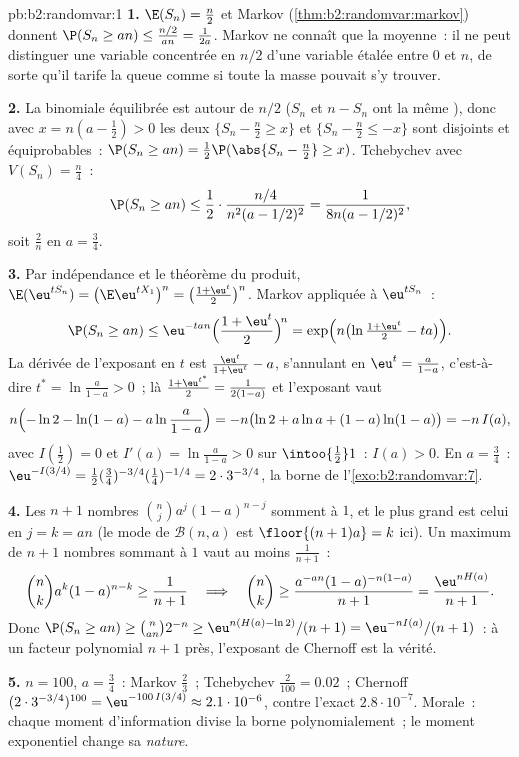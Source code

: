 \begin{solution}{pb:b2:randomvar:1}
\textbf{1.} $\E(S_n) = \frac n2$ et Markov
(\cref{thm:b2:randomvar:markov}) donnent $\P(S_n \geq an) \leq
\frac{n/2}{an} = \frac1{2a}$. Markov ne connaît que la moyenne~: il
ne peut distinguer une variable concentrée en $n/2$ d'une variable
étalée entre $0$ et $n$, de sorte qu'il tarife la queue comme si toute
la masse pouvait s'y trouver.

\textbf{2.} La binomiale équilibrée est  autour de $n/2$
($S_n$ et $n - S_n$ ont la même ), donc avec $x = n(a -
\frac12) > 0$ les deux  $\{S_n - \frac n2 \geq x\}$ et
$\{S_n - \frac n2 \leq -x\}$ sont disjoints et équiprobables~:
$\P(S_n \geq an) = \frac12\P(\abs{S_n - \frac n2} \geq x)$.
Tchebychev avec $V(S_n) = \frac n4$~:
\[
\P(S_n \geq an)
\leq \frac12\cdot\frac{n/4}{n^2(a - 1/2)^2}
= \frac1{8n(a - 1/2)^2},
\]
soit $\frac2n$ en $a = \frac34$.

\textbf{3.} Par indépendance et le théorème du produit,
$\E(\eu^{tS_n}) = \bigl(\E \eu^{tX_1}\bigr)^n = \bigl(\frac{1
+ \eu^t}2\bigr)^n$. Markov appliquée à $\eu^{tS_n}$~:
\[
\P(S_n \geq an) \leq \eu^{-tan}\Bigl(\frac{1 +
\eu^t}2\Bigr)^{\!n} = \exp\Bigl(n\bigl(\ln\tfrac{1 +
\eu^t}2 - ta\bigr)\Bigr).
\]
La dérivée de l'exposant en $t$ est $\frac{\eu^t}{1 + \eu^t}
- a$, s'annulant en $\eu^t = \frac a{1-a}$, c'est-à-dire $t^* =
\ln\frac a{1-a} > 0$~; là $\frac{1 + \eu^{t^*}}2 =
\frac1{2(1-a)}$ et l'exposant vaut
\[
n\Bigl(-\ln 2 - \ln(1-a) - a\ln\frac a{1-a}\Bigr)
= -n\bigl(\ln2 + a\ln a + (1-a)\ln(1-a)\bigr) = -n\,I(a),
\]
avec $I(\frac12) = 0$ et $I'(a) = \ln\frac a{1-a} > 0$ sur
$\intoo{\frac12}1$~: $I(a) > 0$. En $a = \frac34$~:
$\eu^{-I(3/4)} = \frac12(\tfrac34)^{-3/4}(\tfrac14)^{-1/4} =
2\cdot3^{-3/4}$, la borne de l'\cref{exo:b2:randomvar:7}.

\textbf{4.} Les $n + 1$ nombres $\binom nja^j(1-a)^{n-j}$ somment
à $1$, et le plus grand est celui en $j = k = an$ (le mode
de $\mathcal B(n, a)$ est $\floor{(n+1)a} = k$ ici). Un
maximum de $n + 1$ nombres sommant à $1$ vaut au moins
$\frac1{n+1}$~:
\[
\binom nk a^k(1-a)^{n-k} \geq \frac1{n+1}
\quad\Longrightarrow\quad
\binom nk \geq \frac{a^{-an}(1-a)^{-n(1-a)}}{n+1}
= \frac{\eu^{nH(a)}}{n+1}.
\]
Donc $\P(S_n \geq an) \geq \binom{n}{an}2^{-n} \geq
\eu^{n(H(a) - \ln2)}/(n+1) = \eu^{-nI(a)}/(n+1)$~: à un
facteur polynomial $n + 1$ près, l'exposant de Chernoff est la vérité.

\textbf{5.} $n = 100$, $a = \frac34$~: Markov $\frac23$~;
Tchebychev $\frac2{100} = 0.02$~; Chernoff
$(2\cdot3^{-3/4})^{100} = \eu^{-100\,I(3/4)} \approx
2.1\cdot10^{-6}$, contre l'exact $2.8\cdot10^{-7}$. Morale~:
chaque moment d'information divise la borne polynomialement~;
le moment exponentiel change sa \emph{nature}.


\end{solution}
